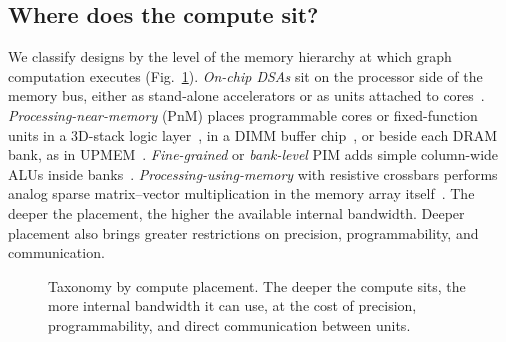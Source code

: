 \documentclass[journal,onecolumn]{IEEEtran}
\begin{document}
\subsection{Where does the compute sit?}
We classify designs by the level of the memory hierarchy at which graph computation executes (Fig.~\ref{fig:placement}). \emph{On-chip DSAs} sit on the processor side of the memory bus, either as stand-alone accelerators or as units attached to cores~\cite{ham2016graphicionado,mukkara2018hats,zhao2022tdgraph}. \emph{Processing-near-memory} (PnM) places programmable cores or fixed-function units in a 3D-stack logic layer~\cite{ahn2015tesseract,zhuo2019graphq}, in a DIMM buffer chip~\cite{talati2022ndminer}, or beside each DRAM bank, as in UPMEM~\cite{gomezluna2022prim}. \emph{Fine-grained} or \emph{bank-level} PIM adds simple column-wide ALUs inside banks~\cite{yenimol2026cograf,shin2025fala}. \emph{Processing-using-memory} with resistive crossbars performs analog sparse matrix--vector multiplication in the memory array itself~\cite{song2018graphr,zheng2020spara,challapalle2020gaasx}. The deeper the placement, the higher the available internal bandwidth. Deeper placement also brings greater restrictions on precision, programmability, and communication.

\begin{figure}[t]
\centering
{}
\caption{Taxonomy by compute placement. The deeper the compute sits, the more internal bandwidth it can use, at the cost of precision, programmability, and direct communication between units.}
\label{fig:placement}
\end{figure}
\end{document}
